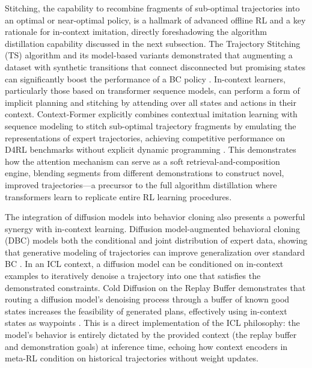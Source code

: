 \documentclass[11pt]{article}
\begin{document}
Stitching, the capability to recombine fragments of sub-optimal trajectories into an optimal or near-optimal policy, is a hallmark of advanced offline RL and a key rationale for in-context imitation, directly foreshadowing the algorithm distillation capability discussed in the next subsection. The Trajectory Stitching (TS) algorithm and its model-based variants demonstrated that augmenting a dataset with synthetic transitions that connect disconnected but promising states can significantly boost the performance of a BC policy \cite{ref353,ref354}. In-context learners, particularly those based on transformer sequence models, can perform a form of implicit planning and stitching by attending over all states and actions in their context. Context-Former explicitly combines contextual imitation learning with sequence modeling to stitch sub-optimal trajectory fragments by emulating the representations of expert trajectories, achieving competitive performance on D4RL benchmarks without explicit dynamic programming \cite{ref355}. This demonstrates how the attention mechanism can serve as a soft retrieval-and-composition engine, blending segments from different demonstrations to construct novel, improved trajectories---a precursor to the full algorithm distillation where transformers learn to replicate entire RL learning procedures.

The integration of diffusion models into behavior cloning also presents a powerful synergy with in-context learning. Diffusion model-augmented behavioral cloning (DBC) models both the conditional and joint distribution of expert data, showing that generative modeling of trajectories can improve generalization over standard BC \cite{ref356}. In an ICL context, a diffusion model can be conditioned on in-context examples to iteratively denoise a trajectory into one that satisfies the demonstrated constraints. Cold Diffusion on the Replay Buffer demonstrates that routing a diffusion model's denoising process through a buffer of known good states increases the feasibility of generated plans, effectively using in-context states as waypoints \cite{ref357}. This is a direct implementation of the ICL philosophy: the model's behavior is entirely dictated by the provided context (the replay buffer and demonstration goals) at inference time, echoing how context encoders in meta-RL condition on historical trajectories without weight updates.
\end{document}
